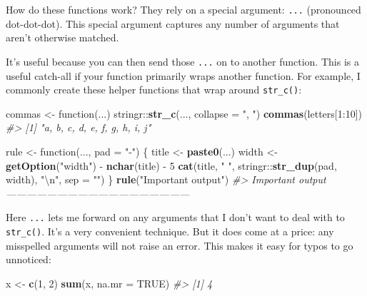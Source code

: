 \documentclass[]{book}
\newenvironment{Shaded}{\begin{snugshade}}{\end{snugshade}}
\newcommand{\KeywordTok}[1]{\textcolor[rgb]{0.13,0.29,0.53}{\textbf{{#1}}}}
\newcommand{\DataTypeTok}[1]{\textcolor[rgb]{0.13,0.29,0.53}{{#1}}}
\newcommand{\DecValTok}[1]{\textcolor[rgb]{0.00,0.00,0.81}{{#1}}}
\newcommand{\CharTok}[1]{\textcolor[rgb]{0.31,0.60,0.02}{{#1}}}
\newcommand{\StringTok}[1]{\textcolor[rgb]{0.31,0.60,0.02}{{#1}}}
\newcommand{\CommentTok}[1]{\textcolor[rgb]{0.56,0.35,0.01}{\textit{{#1}}}}
\newcommand{\OtherTok}[1]{\textcolor[rgb]{0.56,0.35,0.01}{{#1}}}
\newcommand{\NormalTok}[1]{{#1}}
\begin{document}
How do these functions work? They rely on a special argument:
\texttt{...} (pronounced dot-dot-dot). This special argument captures
any number of arguments that aren't otherwise matched.

It's useful because you can then send those \texttt{...} on to another
function. This is a useful catch-all if your function primarily wraps
another function. For example, I commonly create these helper functions
that wrap around \texttt{str\_c()}:

\begin{Shaded}
\begin{Highlighting}[]
\NormalTok{commas <-}\StringTok{ }\NormalTok{function(...) stringr::}\KeywordTok{str_c}\NormalTok{(..., }\DataTypeTok{collapse =} \StringTok{", "}\NormalTok{)}
\KeywordTok{commas}\NormalTok{(letters[}\DecValTok{1}\NormalTok{:}\DecValTok{10}\NormalTok{])}
\CommentTok{#> [1] "a, b, c, d, e, f, g, h, i, j"}

\NormalTok{rule <-}\StringTok{ }\NormalTok{function(..., }\DataTypeTok{pad =} \StringTok{"-"}\NormalTok{) \{}
  \NormalTok{title <-}\StringTok{ }\KeywordTok{paste0}\NormalTok{(...)}
  \NormalTok{width <-}\StringTok{ }\KeywordTok{getOption}\NormalTok{(}\StringTok{"width"}\NormalTok{) -}\StringTok{ }\KeywordTok{nchar}\NormalTok{(title) -}\StringTok{ }\DecValTok{5}
  \KeywordTok{cat}\NormalTok{(title, }\StringTok{" "}\NormalTok{, stringr::}\KeywordTok{str_dup}\NormalTok{(pad, width), }\StringTok{"}\CharTok{\textbackslash{}n}\StringTok{"}\NormalTok{, }\DataTypeTok{sep =} \StringTok{""}\NormalTok{)}
\NormalTok{\}}
\KeywordTok{rule}\NormalTok{(}\StringTok{"Important output"}\NormalTok{)}
\CommentTok{#> Important output ------------------------------------------------------}
\end{Highlighting}
\end{Shaded}

Here \texttt{...} lets me forward on any arguments that I don't want to
deal with to \texttt{str\_c()}. It's a very convenient technique. But it
does come at a price: any misspelled arguments will not raise an error.
This makes it easy for typos to go unnoticed:

\begin{Shaded}
\begin{Highlighting}[]
\NormalTok{x <-}\StringTok{ }\KeywordTok{c}\NormalTok{(}\DecValTok{1}\NormalTok{, }\DecValTok{2}\NormalTok{)}
\KeywordTok{sum}\NormalTok{(x, }\DataTypeTok{na.mr =} \OtherTok{TRUE}\NormalTok{)}
\CommentTok{#> [1] 4}
\end{Highlighting}
\end{Shaded}
\end{document}
